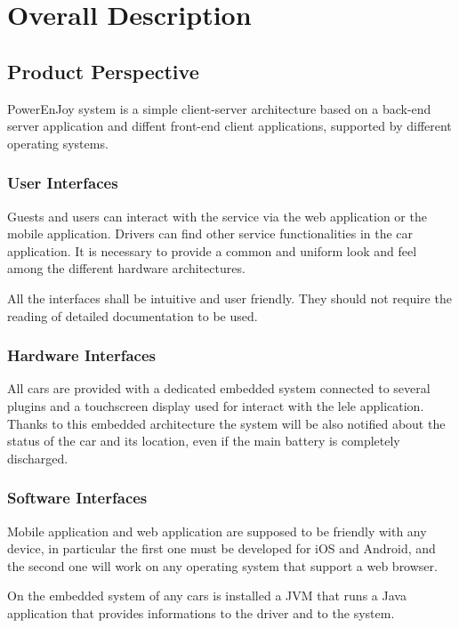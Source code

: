 \section{Overall Description}\label{sec overall-desc}

\subsection{Product Perspective}
PowerEnJoy system is a simple client-server architecture based on a back-end server application and diffent front-end client applications, supported by different operating systems.

\subsubsection{User Interfaces}
Guests and users can interact with the service via the web application or the mobile application. Drivers can find other service functionalities in the car application. It is necessary to provide a common and uniform look and feel among the different hardware architectures.

All the interfaces shall be intuitive and user friendly. They should not require the reading of detailed documentation to be used.

\subsubsection{Hardware Interfaces}

All cars are provided with a dedicated embedded system connected to several plugins and a touchscreen display used for interact with the lele application.
Thanks to this embedded architecture the system will be also notified about the status of the car and its location, even if the main battery is completely discharged.

\subsubsection{Software Interfaces}

Mobile application and web application are supposed to be friendly with any device, in particular the first one must be developed for iOS and Android, and the second one will work on any operating system that support a web browser.

On the embedded system of any cars is installed a JVM that runs a Java application that provides informations to the driver and to the system.

